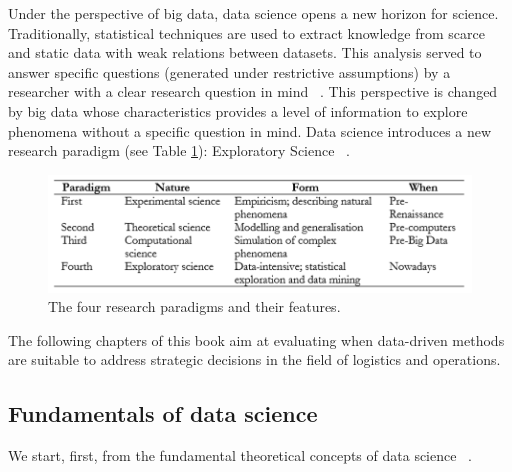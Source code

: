 Under the perspective of big data, data science opens a new horizon for science. Traditionally, statistical techniques are used to extract knowledge from scarce and static data with weak relations between datasets. This analysis served to answer specific questions (generated under restrictive assumptions) by a researcher with a clear research question in mind ~\cite{Miller2010}. This perspective is changed by big data whose characteristics provides a level of information to explore phenomena without a specific question in mind. Data science introduces a new research paradigm (see Table \ref{tab_paradigms}): Exploratory Science ~\cite{Hey2009}. 


\begin{figure}[hbt!]
\centering
\includegraphics[width=1\textwidth]{SectionIntroduction/introduction_figures/tab_paradigms.png}
\captionsetup{type=table}
\caption{The four research paradigms and their features.}
\label{tab_paradigms}
\end{figure}

The following chapters of this book aim at evaluating when data-driven methods are suitable to address strategic decisions in the field of logistics and operations.

\subsection{Fundamentals of data science}
We start, first, from the fundamental theoretical concepts of data science ~\cite{Provost2013}. 

